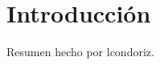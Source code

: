 \documentclass[../main.tex]{subfiles}
\begin{document}
    \section{Introducción} 
        Resumen hecho por lcondoriz.
\end{document}
